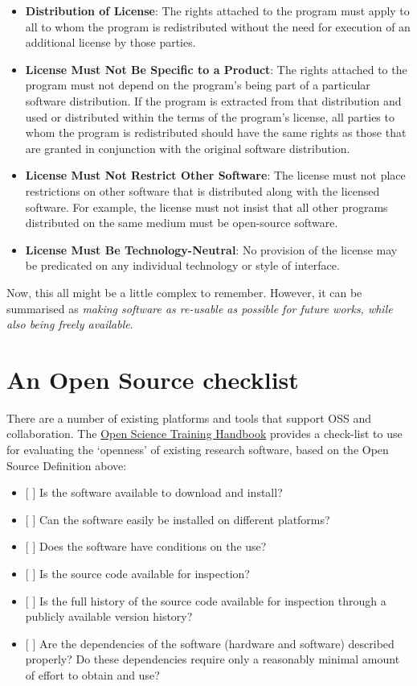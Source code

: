 \documentclass[]{book}
\begin{document}
{{{{{{{{{{{\begin{itemize}
\item
  \textbf{Distribution of License}: The rights attached to the program must apply to all to whom the program is redistributed without the need for execution of an additional license by those parties.
\item
  \textbf{License Must Not Be Specific to a Product}: The rights attached to the program must not depend on the program's being part of a particular software distribution. If the program is extracted from that distribution and used or distributed within the terms of the program's license, all parties to whom the program is redistributed should have the same rights as those that are granted in conjunction with the original software distribution.
\item
  \textbf{License Must Not Restrict Other Software}: The license must not place restrictions on other software that is distributed along with the licensed software. For example, the license must not insist that all other programs distributed on the same medium must be open-source software.
\item
  \textbf{License Must Be Technology-Neutral}: No provision of the license may be predicated on any individual technology or style of interface.
\end{itemize}

Now, this all might be a little complex to remember. However, it can be summarised as \emph{making software as re-usable as possible for future works, while also being freely available}.

\hypertarget{an-open-source-checklist}{%
\section{An Open Source checklist}\label{an-open-source-checklist}}

There are a number of existing platforms and tools that support OSS and collaboration. The \href{https://open-science-training-handbook.gitbook.io/book/}{Open Science Training Handbook} provides a check-list to use for evaluating the `openness' of existing research software, based on the Open Source Definition above:

\begin{itemize}
\item
  {[} {]} Is the software available to download and install?
\item
  {[} {]} Can the software easily be installed on different platforms?
\item
  {[} {]} Does the software have conditions on the use?
\item
  {[} {]} Is the source code available for inspection?
\item
  {[} {]} Is the full history of the source code available for inspection through a publicly available version history?
\item
  {[} {]} Are the dependencies of the software (hardware and software) described properly? Do these dependencies require only a reasonably minimal amount of effort to obtain and use?
\end{itemize}

}}}}}}}}}}}
\end{document}

